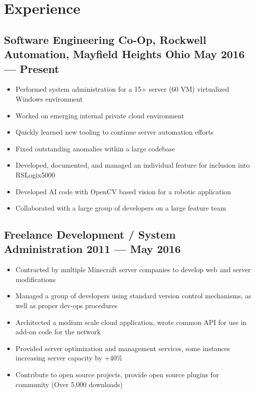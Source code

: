 \newcommand{\expentry}[2]{%
    \subsection{#1 \hfill #2}%
}
\section{Experience}
\expentry{Software Engineering Co-Op, Rockwell Automation, Mayfield Heights Ohio}{May 2016 --- Present}
\begin{itemize}
    \itemsep0em
    \item Performed system administration for a 15+ server (60 VM) virtualized Windows environment
    \item Worked on emerging internal private cloud environment
    \item Quickly learned new tooling to continue server automation efforts
    \item Fixed outstanding anomalies within a large codebase
    \item Developed, documented, and managed an individual feature for inclusion into RSLogix5000
    \item Developed AI code with OpenCV based vision for a robotic application
    \item Collaborated with a large group of developers on a large feature team
\end{itemize}
\expentry{Freelance Development / System Administration}{2011 --- May 2016}
\begin{itemize}
    \itemsep0em
    \item Contracted by multiple Minecraft server companies to develop web and server modifications
    \item Managed a group of developers using standard version control mechanisms, as well as proper dev-ops procedures
    \item Architected a medium scale cloud application, wrote common API for use in add-on code for the network
    \item Provided server optimization and management services, some instances increasing server capacity by +40\%
    \item Contribute to open source projects, provide open source plugins for community (Over 5,000 downloads)
\end{itemize}
